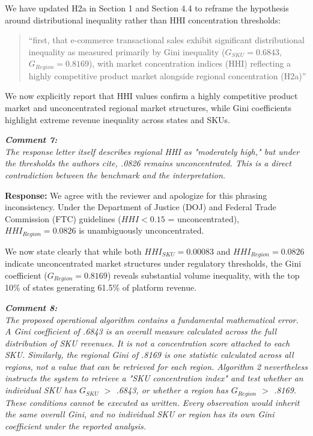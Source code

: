 \documentclass[11pt]{article}
\newcommand{\comment}[1]{\vspace{12pt}\noindent\colorbox{gray!10}{\parbox{\dimexpr\textwidth-2\fboxsep\relax}{\color{commentcolor}\itshape #1}}\vspace{6pt}}
\newcommand{\response}{\vspace{6pt}\noindent\textbf{Response: }}
\newcommand{\update}[1]{\textcolor{updatecolor}{#1}}
\begin{document}
We have updated H2a in Section 1 and Section 4.4 to reframe the hypothesis around distributional inequality rather than HHI concentration thresholds:
\begin{quote}
\update{``first, that e-commerce transactional sales exhibit significant distributional inequality as measured primarily by Gini inequality ($G_{SKU} = 0.6843$, $G_{Region} = 0.8169$), with market concentration indices (HHI) reflecting a highly competitive product market alongside regional concentration (H2a)''}
\end{quote}
We now explicitly report that HHI values confirm a highly competitive product market and unconcentrated regional market structures, while Gini coefficients highlight extreme revenue inequality across states and SKUs.

\comment{\textbf{Comment 7:} \\
The response letter itself describes regional HHI as "moderately high," but under the thresholds the authors cite, .0826 remains unconcentrated. This is a direct contradiction between the benchmark and the interpretation.}

\response
We agree with the reviewer and apologize for this phrasing inconsistency. Under the Department of Justice (DOJ) and Federal Trade Commission (FTC) guidelines ($HHI < 0.15$ = unconcentrated), $HHI_{Region} = 0.0826$ is unambiguously unconcentrated.

We now state clearly that while both $HHI_{SKU} = 0.00083$ and $HHI_{Region} = 0.0826$ indicate unconcentrated market structures under regulatory thresholds, the Gini coefficient ($G_{Region} = 0.8169$) reveals substantial volume inequality, with the top 10\% of states generating 61.5\% of platform revenue.

\comment{\textbf{Comment 8:} \\
The proposed operational algorithm contains a fundamental mathematical error. A Gini coefficient of .6843 is an overall measure calculated across the full distribution of SKU revenues. It is not a concentration score attached to each SKU. Similarly, the regional Gini of .8169 is one statistic calculated across all regions, not a value that can be retrieved for each region. Algorithm 2 nevertheless instructs the system to retrieve a "SKU concentration index" and test whether an individual SKU has $G_{SKU}$ $>$ .6843, or whether a region has $G_{Region}$ $>$ .8169. These conditions cannot be executed as written. Every observation would inherit the same overall Gini, and no individual SKU or region has its own Gini coefficient under the reported analysis.}
\end{document}
